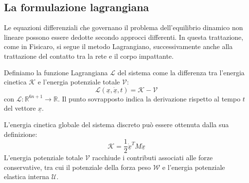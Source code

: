 \subsection{La formulazione lagrangiana}
Le equazioni differenziali che governano il problema dell'equilibrio dinamico non lineare possono essere dedotte secondo approcci differenti. In questa trattazione, come in Fisicaro\cite{Fisicaro}, si segue il metodo Lagrangiano, successivamente anche alla trattazione del contatto tra la rete e il corpo impattante.

Definiamo la funzione Lagrangiana $\mathcal{L}$ del sistema come la differenza tra l'energia cinetica $\mathcal{K}$ e l'energia potenziale totale $\mathcal{V}$:
\begin{equation}
   \mathcal{L}(\underline{x}, \underline{\dot{x}}, t) = \mathcal{K} - \mathcal{V}
   \label{eq:funzione_lagrangiana}
\end{equation}
con $\mathcal{L}: \mathbb{R}^{6n+1} \rightarrow \mathbb{R}$. Il punto sovrapposto indica la derivazione rispetto al tempo $t$ del vettore $\underline{x}$. 

L'energia cinetica globale del sistema discreto può essere ottenuta dalla sua definizione: 
\begin{equation}
   \mathcal{K} = \frac{1}{2} \underline{\dot{x}}^T M \underline{\dot{x}}
   \label{eq:energia_cinetica}
\end{equation}
L'energia potenziale totale $\mathcal{V}$ racchiude i contributi associati alle forze conservative, tra cui il potenziale della forza peso $\mathcal{W}$ e l'energia potenziale elastica interna $\mathcal{U}$.

